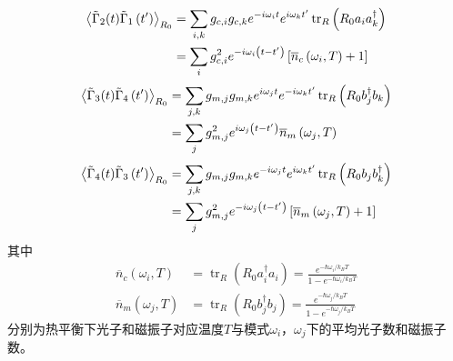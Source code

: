 \begin{align}
\left\langle\tilde{\Gamma}_{2}(t) \tilde{\Gamma}_{1}\left(t^{\prime}\right)\right\rangle_{R_0} &=\sum_{i, k} g_{c,i} g_{c,k} e^{-i \omega_{i} t} e^{i \omega_{k} t^{\prime}} \operatorname{tr}_{R}\left(R_{0} a_{i} a_{k}^{\dag}\right) \notag \\
&=\sum_{i} g_{c,i}^{2} e^{-i \omega_{i}\left(t-t^{\prime}\right)} \left[\overline{n}_c \left(\omega_{i}, T\right)+1\right]
\end{align}
\begin{align}
\left\langle\tilde{\Gamma}_{3}(t) \tilde{\Gamma}_{4}\left(t^{\prime}\right)\right\rangle_{R_0} &=\sum_{j, k} g_{m,j} g_{m,k} e^{i \omega_{j} t} e^{-i \omega_{k} t^{\prime}} \operatorname{tr}_{R}\left(R_{0} b_{j}^{\dagger} b_{k}\right) \notag \\
&=\sum_{j} g_{m,j}^{2} e^{i \omega_{j}\left(t-t^{\prime}\right)} \overline{n}_m\left(\omega_{j}, T\right)
\end{align}
\begin{align}
\left\langle\tilde{\Gamma}_{4}(t) \tilde{\Gamma}_{3}\left(t^{\prime}\right)\right\rangle_{R_0} &=\sum_{j, k} g_{m,j} g_{m,k} e^{-i \omega_{j} t} e^{i \omega_{k} t^{\prime}} \operatorname{tr}_{R}\left(R_{0} b_{j} b_{k}^{\dagger}\right) \notag \\
&=\sum_{j} g_{m,j}^{2} e^{-i \omega_{j}\left(t-t^{\prime}\right)}\left[\overline{n}_m\left(\omega_{j}, T\right)+1\right] \label{Correlations4}
\end{align}
其中
\begin{equation}
\begin{aligned}
\overline{n}_c\left(\omega_{i}, T\right) &=\operatorname{tr}_{R}\left(R_{0} a_{i}^{\dagger} a_{i}\right)=\frac{e^{-\hbar \omega_{i} / k_{B} T}}{1-e^{-\hbar \omega_{i} / k_{B} T}}
\\
\overline{n}_m\left(\omega_{j}, T\right) &=\operatorname{tr}_{R}\left(R_{0} b_{j}^{\dagger} b_{j}\right)=\frac{e^{-\hbar \omega_{j} / k_{B} T}}{1-e^{-\hbar \omega_{j} / k_{B} T}}
\end{aligned}
\end{equation}
分别为热平衡下光子和磁振子对应温度$T$与模式$\omega_{i}$，$\omega_{j}$下的平均光子数和磁振子数。

